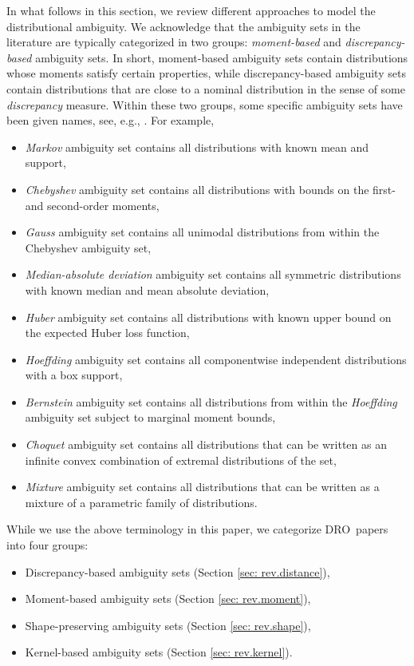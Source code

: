 \documentclass[final,onefignum,onetabnum]{class}
\newcommand{\dro}{DRO}
\begin{document}
In what follows in this section, we review different approaches to model the distributional ambiguity. 
We acknowledge that the ambiguity sets in the literature are  typically categorized in two groups: {\it moment-based} and {\it discrepancy-based} ambiguity sets. In short, moment-based ambiguity sets contain distributions whose moments satisfy certain properties, while  discrepancy-based ambiguity sets contain distributions that are close to a nominal distribution in the sense of  some {\it discrepancy} measure. Within these two groups, some specific ambiguity sets have been given names, see, e.g., \citet{hanasusanto2015chance}. For example, 
\begin{itemize}
	\item {\it Markov} ambiguity set contains all distributions with known mean and support, 
	\item {\it Chebyshev} ambiguity set contains all distributions with  bounds on the first- and second-order moments, 
	\item {\it Gauss} ambiguity set contains all unimodal distributions from within the Chebyshev ambiguity set,
	\item {\it Median-absolute
	deviation} ambiguity set contains all symmetric distributions with known median
	and mean absolute deviation, 
	\item {\it Huber} ambiguity set contains all distributions
	with known upper bound on the expected Huber loss function, 
	\item {\it Hoeffding}	ambiguity set contains all componentwise independent distributions with a box support,  
	\item {\it Bernstein} ambiguity set contains all distributions from within
	the {\it Hoeffding} ambiguity set subject to marginal moment bounds, 
	\item {\it Choquet} ambiguity set contains all distributions that can be written as  an infinite convex combination of extremal distributions of the set, 
	\item {\it Mixture} ambiguity set contains all distributions that can be written as a  mixture of a parametric family of distributions.  
\end{itemize}
While we use the above terminology in this paper, we categorize  \dro\ papers into four groups: %
\begin{itemize}
	\item  Discrepancy-based ambiguity sets (Section \ref{sec: rev.distance}),
	\item Moment-based ambiguity sets (Section \ref{sec: rev.moment}),
	\item Shape-preserving ambiguity sets (Section \ref{sec: rev.shape}),
	\item Kernel-based ambiguity sets (Section \ref{sec: rev.kernel}).
\end{itemize}
\end{document}
